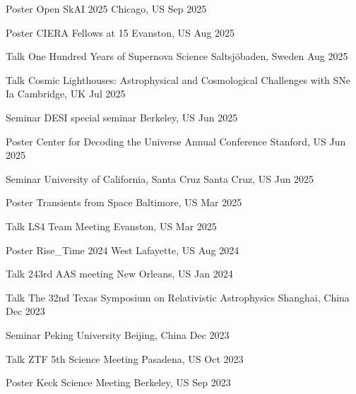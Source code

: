 


\begin{cventries}
	
	\cvsimsimpentry
	{Poster}
	{Open SkAI 2025}
	{Chicago, US}
	{Sep 2025}

	\cvsimsimpentry
	{Poster}
	{CIERA Fellows at 15}
	{Evanston, US}
	{Aug 2025}

	\cvsimsimpentry
	{Talk}
	{One Hundred Years of Supernova Science}
	{Saltsjöbaden, Sweden}
	{Aug 2025}

	\cvsimsimpentry
	{Talk}
	{Cosmic Lighthouses: Astrophysical and Cosmological Challenges with SNe Ia}
	{Cambridge, UK}
	{Jul 2025}

	\cvsimsimpentry
	{Seminar}
	{DESI special seminar}
	{Berkeley, US}
	{Jun 2025}

	\cvsimsimpentry
	{Poster}
	{Center for Decoding the Universe Annual Conference}
	{Stanford, US}
	{Jun 2025}

	\cvsimsimpentry
	{Seminar}
	{University of California, Santa Cruz}
	{Santa Cruz, US}
	{Jun 2025}

	\cvsimsimpentry
	{Poster}
	{Transients from Space}
	{Baltimore, US}
	{Mar 2025}

	\cvsimsimpentry
	{Talk}
	{LS4 Team Meeting}
	{Evanston, US}
	{Mar 2025}

	\cvsimsimpentry
	{Poster}
	{Rise\_Time 2024}
	{West Lafayette, US}
	{Aug 2024}

	\cvsimsimpentry
	{Talk}
	{243rd AAS meeting}
	{New Orleans, US}
	{Jan 2024}

	\cvsimsimpentry
	{Talk}
	{The 32nd Texas Symposium on Relativistic Astrophysics}
	{Shanghai, China}
	{Dec 2023}

	\cvsimsimpentry
	{Seminar}
	{Peking University}
	{Beijing, China}
	{Dec 2023}

	\cvsimsimpentry
	{Talk}
	{ZTF 5th Science Meeting}
	{Pasadena, US}
	{Oct 2023}
	
	\cvsimsimpentry
	{Poster}
	{Keck Science Meeting}
	{Berkeley, US}
	{Sep 2023}


\end{cventries}
